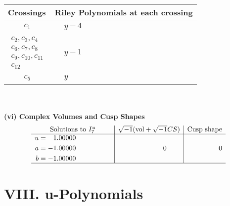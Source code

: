\documentclass[1p]{elsarticle_modified}
\theoremstyle{definition}
\newcommand{\I}{\sqrt{-1}}
\begin{document}
\begin{tabular}{m{50pt}|m{274pt}}
Crossings & \hspace{64pt}Riley Polynomials at each crossing \\
\hline $$\begin{aligned}c_{1}\end{aligned}$$&$\begin{aligned}
&y-4
\end{aligned}$\\
\hline $$\begin{aligned}c_{2},c_{3},c_{4}\\c_{6},c_{7},c_{8}\\c_{9},c_{10},c_{11}\\c_{12}\end{aligned}$$&$\begin{aligned}
&y-1
\end{aligned}$\\
\hline $$\begin{aligned}c_{5}\end{aligned}$$&$\begin{aligned}
&y
\end{aligned}$\\
\hline
\end{tabular}\\~\\
\newpage\flushleft \textbf{(vi) Complex Volumes and Cusp Shapes}
$$\begin{array}{c|c|c}  
\text{Solutions to }I^u_{7}& \I (\text{vol} + \sqrt{-1}CS) & \text{Cusp shape}\\
 \hline 
\begin{aligned}
u &= \phantom{-}1.00000\phantom{ +0.000000I} \\
a &= -1.00000\phantom{ +0.000000I} \\
b &= -1.00000\phantom{ +0.000000I}\end{aligned}
 & \phantom{-0.000000 } 0 & \phantom{-0.000000 } 0\\
 \hline 
 \end{array}$$\newpage
\newpage\renewcommand{\arraystretch}{1}
\centering \section*{ VIII. u-Polynomials}
\end{document}
